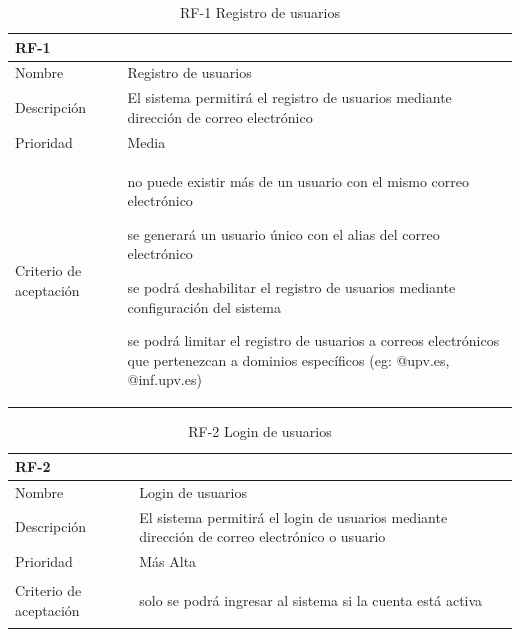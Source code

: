\documentclass[11pt,spanish,listoffigures,listoftables]{tfgetsinf}
\begin{document}
\begin{table}[h]
	\centering
	\begin{tabular}{ |p{4cm}||p{10cm}|  }
		\multicolumn{2}{l}{\textbf{RF-1}} \\
		\hline
		Nombre   & Registro de usuarios\\
		\hline
		Descripción  & El sistema permitirá el registro de usuarios mediante dirección de correo electrónico   \\
		\hline
		Prioridad &  Media\\
		\hline
		Criterio de aceptación & 
		\begin{tabitem}
			\item no puede existir más de un usuario con el mismo correo electrónico
			\item se generará un usuario único con el alias del correo electrónico
			\item se podrá deshabilitar el registro de usuarios mediante configuración del sistema
			\item se podrá limitar el registro de usuarios a correos electrónicos que pertenezcan a dominios específicos (eg: @upv.es, @inf.upv.es)
		\end{tabitem} \\
		\hline
	\end{tabular}
	\caption{RF-1 Registro de usuarios}
	\label{table:1}
\end{table}

\begin{table}[h]
	\centering
	\begin{tabular}{ |p{4cm}||p{10cm}|  }
		\multicolumn{2}{l}{\textbf{RF-2}} \\
		\hline
		Nombre   & Login de usuarios\\
		\hline
		Descripción  & El sistema permitirá el login de usuarios mediante dirección de correo electrónico o usuario  \\
		\hline
		Prioridad &  Más Alta\\
		\hline
		Criterio de aceptación & 
		\begin{tabitem}
			\item solo se podrá ingresar al sistema si la cuenta está activa
		\end{tabitem} \\
		\hline
	\end{tabular}
	\caption{RF-2 Login de usuarios}
	\label{table:2}
\end{table}
\end{document}

